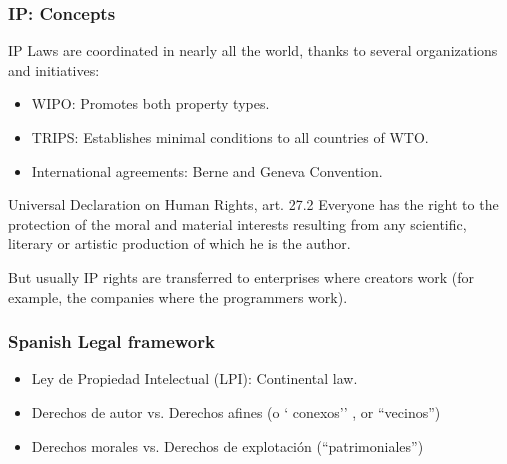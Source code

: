 
\begin{frame}
\frametitle{IP: Concepts}

IP Laws are coordinated in nearly all the world, thanks to several
organizations and initiatives:
\begin{itemize}
\item WIPO: Promotes both property types.
\item TRIPS: Establishes minimal conditions to all countries of WTO.
\item International agreements: Berne and Geneva Convention. 
\end{itemize}

\begin{block}{Universal Declaration on Human Rights, art. 27.2}
Everyone has the right to the protection of the moral and material interests resulting from any scientific, literary or artistic production of which he is the author.
\end{block}

\small
But usually IP rights are transferred to enterprises where creators
work (for example, the companies where the programmers work).

\normalsize

\end{frame}


\begin{frame}
\frametitle{Spanish Legal framework}

\begin{itemize}
\item Ley de Propiedad Intelectual (LPI): Continental law. 
\item Derechos de autor vs. Derechos afines (o ` conexos'' , or ``vecinos'') 
\item Derechos morales vs. Derechos de explotación (``patrimoniales'')
\end{itemize}

\end{frame}



